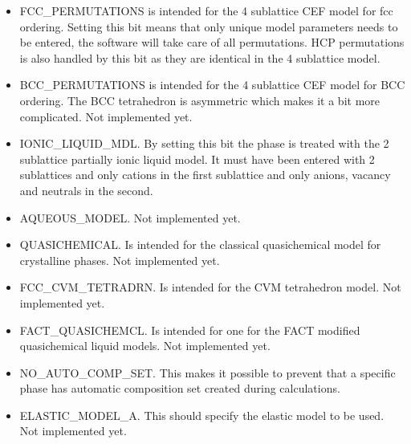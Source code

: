 \documentclass[12pt]{article}
\begin{document}
\begin{itemize}
\item FCC\_PERMUTATIONS is intended for the 4 sublattice CEF model for
fcc ordering.  Setting this bit means that only unique model
parameters needs to be entered, the software will take care of all
permutations.  HCP permutations is also handled by this bit as they
are identical in the 4 sublattice model.

\item BCC\_PERMUTATIONS is intended for the 4 sublattice CEF model for
BCC ordering.  The BCC tetrahedron is asymmetric which makes it a bit
more complicated.  Not implemented yet.

\item IONIC\_LIQUID\_MDL.  By setting this bit the phase is treated
with the 2 sublattice partially ionic liquid model.  It must have been
entered with 2 sublattices and only cations in the first sublattice
and only anions, vacancy and neutrals in the second.

\item AQUEOUS\_MODEL. Not implemented yet.

\item QUASICHEMICAL. Is intended for the classical quasichemical
model for crystalline phases.  Not implemented yet.

\item FCC\_CVM\_TETRADRN.  Is intended for the CVM tetrahedron model.
Not implemented yet.

\item FACT\_QUASICHEMCL.  Is intended for one for the FACT modified
quasichemical liquid models.  Not implemented yet.

\item NO\_AUTO\_COMP\_SET.  This makes it possible to prevent that a
specific phase has automatic composition set created during
calculations.

\item ELASTIC\_MODEL\_A.  This should specify the elastic model to be
used.  Not implemented yet.
\end{itemize}
\end{document}
